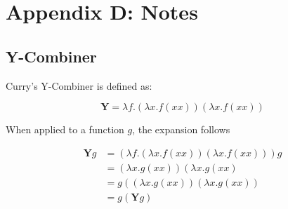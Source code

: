 
\section{Appendix D: Notes}
\label{sec:appendix_notes}
\subsection{Y-Combiner}

% 
% 

Curry's Y-Combiner \cite{WikiY} is defined as:

\begin{equation}
\mathbf{Y} = 
\lambda f . 
\left( \lambda x . f \left( x x \right) \right)
\left( \lambda x . f \left( x x \right) \right)
\label{eq:y_combiner}
\end{equation}

When applied to a function $g$, the expansion follows \cite{WikiY}

\begin{equation}
\begin{aligned}
\mathbf{Y}g 
& = \left( \lambda f .  \left( \lambda x . f \left( x x \right) \right) \left( \lambda x . f \left( x x \right) \right) \right) g \\
& = \left( \lambda x . g \left( x x \right) \right) \left( \lambda x . g \left( x x \right) \\
& = g \left( \left( \lambda x . g \left( x x \right) \right) \left( \lambda x . g \left( x x \right) \right) \\
& = g \left( \mathbf{Y} g \right)
\end{aligned}
\label{eq:y_combiner}
\end{equation}



